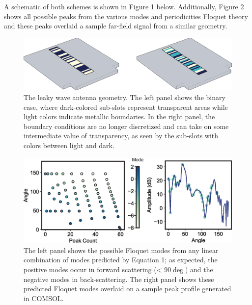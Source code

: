 \documentclass[11pt]{article}
\begin{document}
\noindent A schematic of both schemes is shown in Figure 1 below. Additionally, Figure 2 shows all possible peaks from the various modes and periodicities Floquet theory and these peaks overlaid a sample far-field signal from a similar geometry.

\begin{figure}
		\centering
		\includegraphics[width = 6in]{figures/fig5.eps}
		\caption{The leaky wave antenna geometry. The left panel shows the binary case, where dark-colored sub-slots represent transparent areas while light colors indicate metallic boundaries. In the right panel, the boundary conditions are no longer discretized and can take on some intermediate value of transparency, as seen by the sub-slots with colors between light and dark.}
\end{figure}


\begin{figure}[H]
	\centering
	\includegraphics[width=6in]{figures/fig4_labeled2.eps}
	\caption{The left panel shows the possible Floquet modes from any linear combination of modes predicted by Equation 1; as expected, the positive modes occur in forward scattering (< 90$\deg$) and the negative modes in back-scattering. The right panel shows these predicted Floquet modes overlaid on a sample peak profile generated in COMSOL.}
\end{figure}
\end{document}
